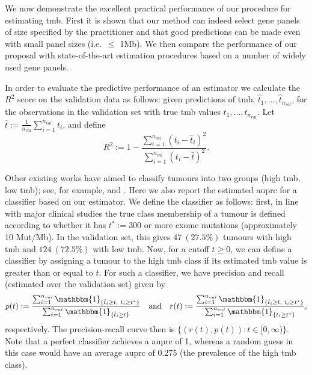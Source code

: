 \documentclass[../thesis.tex]{subfiles}
\begin{document}
We now demonstrate the excellent practical performance of our procedure for estimating \gls{tmb}.  First it is shown that our method can indeed select gene panels of size specified by the practitioner and that good predictions can be made even with small panel sizes (i.e.~$\leq$ 1Mb). We then compare the performance of our proposal with state-of-the-art estimation procedures based on a number of widely used gene panels.

In order to evaluate the predictive performance of an estimator we calculate the $R^2$ score on the validation data as follows: given predictions of \gls{tmb}, $\hat{t}_1, \ldots, \hat{t}_{n_{val}}$, for the observations in the validation set with true \gls{tmb} values $t_1, \ldots, t_{n_{val}}$. Let $\bar{t} := \frac{1}{n_{val}} \sum_{i=1}^{n_{val}} t_i$, and define 
    \[
    R^2 := 1- \frac{\sum_{i =1}^{n_{val}}(t_i - \hat{t}_i)^2}{\sum_{i = 1}^{n_{val}}(t_i - \bar{t})^2}. 
    \]
    
 Other existing works have aimed to classify tumours into two groups (high \gls{tmb}, low \gls{tmb}); see, for example, \citet{buttner_implementing_2019} and \citet{wu_designing_2019}. Here we also report the estimated \gls{auprc} for a classifier based on our estimator. We define the classifier as follows: first, in line with major clinical studies \citep[e.g.][]{hellmann_nivolumab_2018, ramalingam_tumor_2018} the true class membership of a tumour is defined according to whether it has $t^* := 300$ or more exome mutations (approximately 10 Mut/Mb). In the validation set, this gives  $47 \ (27.5 \% )$ tumours with high \gls{tmb} and $124 \ (72.5 \% ) $ with low \gls{tmb}. Now, for a cutoff $t \geq 0$, we can define a classifier by assigning a tumour to the high \gls{tmb} class if its estimated \gls{tmb} value is greater than or equal to $t$.  For such a classifier, we have precision and recall (estimated over the validation set) given by
 \[
 p(t) := \frac{\sum_{i=1}^{n_{val}} \mathbbm{1}_{\{\hat{t}_i \geq t, \ t_i \geq t^*\}}}{\sum_{i=1}^{n_{val}} \mathbbm{1}_{\{\hat{t}_i \geq t\}}} \quad \text{and} \quad   r(t) := \frac{\sum_{i=1}^{n_{val}} \mathbbm{1}_{\{\hat{t}_i \geq t, \ t_i \geq t^*\}}}{\sum_{i=1}^{n_{val}} \mathbbm{1}_{\{t_i \geq t^*\}}},
 \]
respectively.  The precision-recall curve then is $\{(r(t),p(t)): t \in [0, \infty)\}$. Note that a perfect classifier achieves a \gls{auprc} of 1, whereas a random guess in this case would have an average \gls{auprc} of {0.275} (the prevalence of the high \gls{tmb} class).
\end{document}
